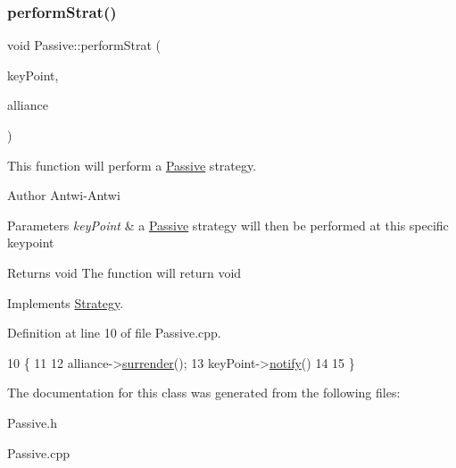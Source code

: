 \subsubsection{\texorpdfstring{perform\+Strat()}{performStrat()}}
{\footnotesize\ttfamily void Passive\+::perform\+Strat (\begin{DoxyParamCaption}\item[{\hyperlink{classKeyPoint}{Key\+Point} $\ast$}]{key\+Point,  }\item[{\hyperlink{classAlliance}{Alliance} $\ast$}]{alliance }\end{DoxyParamCaption})\hspace{0.3cm}{\ttfamily [virtual]}}



This function will perform a \hyperlink{classPassive}{Passive} strategy. 

\begin{DoxyAuthor}{Author}
Antwi-\/\+Antwi
\end{DoxyAuthor}

\begin{DoxyParams}{Parameters}
{\em key\+Point} & a \hyperlink{classPassive}{Passive} strategy will then be performed at this specific keypoint\\
\hline
\end{DoxyParams}
\begin{DoxyReturn}{Returns}
void The function will return void 
\end{DoxyReturn}


Implements \hyperlink{classStrategy_aa0692005cb67d0ee2441046f6b302e7d}{Strategy}.



Definition at line 10 of file Passive.\+cpp.


\begin{DoxyCode}
10                                                                  \{
11     
12     alliance->\hyperlink{classAlliance_ad3b8272ccec63d3a32b7e241434948e9}{surrender}();
13     keyPoint->\hyperlink{classKeyPoint_a5b21817babe753b2b684d70479f3eaf2}{notify}()
14 
15 \}
\end{DoxyCode}


The documentation for this class was generated from the following files\+:\begin{DoxyCompactItemize}
\item 
Passive.\+h\item 
Passive.\+cpp\end{DoxyCompactItemize}
